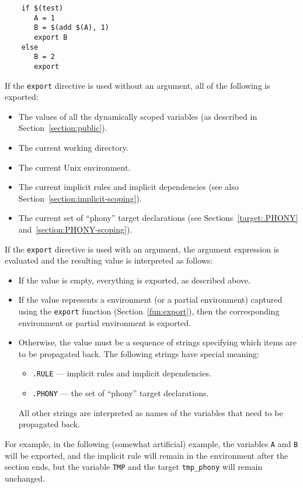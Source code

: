 \begin{verbatim}
    if $(test)
       A = 1
       B = $(add $(A), 1)
       export B
    else
       B = 2
       export
\end{verbatim}

If the \verb+export+ directive is used without an argument, all of the following is exported:
\begin{itemize}
\item The values of all the dynamically scoped variables (as described in
Section~\ref{section:public}).
\item The current working directory.
\item The current Unix environment.
\item The current implicit rules and implicit dependencies (see also
Section~\ref{section:implicit-scoping}).
\item The current set of ``phony'' target declarations (see Sections~\ref{target:.PHONY}
and~\ref{section:PHONY-scoping}).
\end{itemize}

If the \verb+export+ directive is used with an argument, the argument expression is evaluated
and the resulting value is interpreted as follows:
\begin{itemize}
\item If the value is empty, everything is exported, as described above.
\item If the value represents a environment (or a partial environment) captured using the
\verb+export+ function (Section~\ref{fun:export}), then the corresponding environment or partial
environment is exported.
\item Otherwise, the value must be a sequence of strings specifying which items are to be propagated
back. The following strings have special meaning:
\begin{itemize}
\item {}\verb+.RULE+ --- implicit rules and implicit dependencies.
\item {}\verb+.PHONY+ --- the set of ``phony'' target declarations.
\end{itemize}
All other strings are interpreted as names of the variables that need to be propagated back.
\end{itemize}

For example, in the following (somewhat artificial) example, the variables \verb+A+ and \verb+B+
will be exported, and the implicit rule will remain in the environment after the section ends, but
the variable \verb+TMP+ and the target \verb+tmp_phony+ will remain unchanged.

